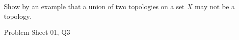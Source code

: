 \begin{samepage}
\begin{ex}
Show by an example that a union of two topologies on a set $X$ may not be a topology.
\end{ex}
\begin{source}
Problem Sheet 01, Q3
\end{source}
\end{samepage}

